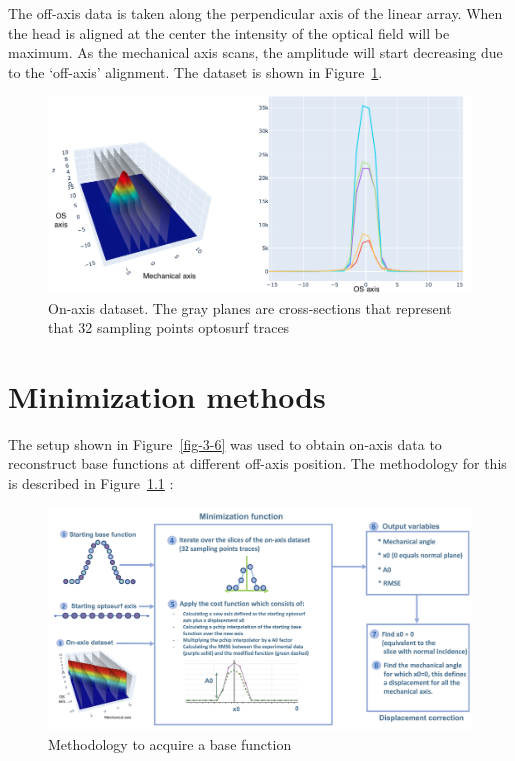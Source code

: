 \documentclass[
  letterpaper,
  DIV=11,
  numbers=noendperiod,
  oneside]{scrreprt}
\begin{document}
The off-axis data is taken along the perpendicular axis of the linear
array. When the head is aligned at the center the intensity of the
optical field will be maximum. As the mechanical axis scans, the
amplitude will start decreasing due to the `off-axis' alignment. The
dataset is shown in Figure~\ref{fig-3-9}.

\begin{figure}

{\centering \includegraphics{notebooks/figures/b/fig_3_4_offaxis.png}

}

\caption{\label{fig-3-9}On-axis dataset. The gray planes are
cross-sections that represent that 32 sampling points optosurf traces}

\end{figure}

\newpage


\hypertarget{minimization-methods}{%
\chapter{Minimization methods}\label{minimization-methods}}

The setup shown in Figure~\ref{fig-3-6} was used to obtain on-axis data
to reconstruct base functions at different off-axis position. The
methodology for this is described in Figure~\ref{fig-4-1} :

\begin{figure}

{\centering \includegraphics{notebooks/figures/c/fig_4_1_minimization.png}

}

\caption{\label{fig-4-1}Methodology to acquire a base function}

\end{figure}
\end{document}
